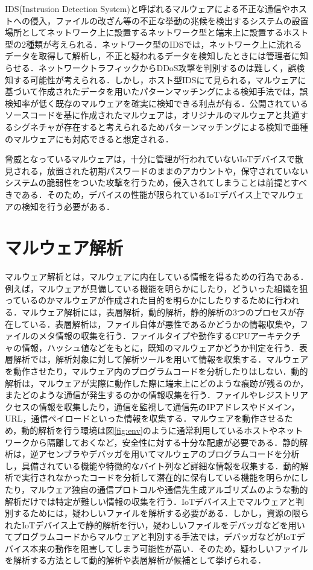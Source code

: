 IDS(Instrusion Detection System)と呼ばれるマルウェアによる不正な通信やホストへの侵入，ファイルの改ざん等の不正な挙動の兆候を検出するシステムの設置場所としてネットワーク上に設置するネットワーク型と端末上に設置するホスト型の2種類が考えられる．ネットワーク型のIDSでは，ネットワーク上に流れるデータを取得して解析し，不正と疑われるデータを検知したときには管理者に知らせる．ネットワークトラフィックからDDoS攻撃を判別するのは難しく，誤検知する可能性が考えられる．しかし，ホスト型IDSにて見られる，マルウェアに基づいて作成されたデータを用いたパターンマッチングによる検知手法では，誤検知率が低く既存のマルウェアを確実に検知できる利点が有る．公開されているソースコードを基に作成されたマルウェアは，オリジナルのマルウェアと共通するシグネチャが存在すると考えられるためパターンマッチングによる検知で亜種のマルウェアにも対応できると想定される．\par
脅威となっているマルウェアは，十分に管理が行われていないIoTデバイスで散見される，放置された初期パスワードのままのアカウントや，保守されていないシステムの脆弱性をついた攻撃を行うため，侵入されてしまうことは前提とすべきである．そのため，デバイスの性能が限られているIoTデバイス上でマルウェアの検知を行う必要がある．
\section{マルウェア解析}
マルウェア解析とは，マルウェアに内在している情報を得るための行為である．例えば，マルウェアが具備している機能を明らかにしたり，どういった組織を狙っているのかマルウェアが作成された目的を明らかにしたりするために行われる\cite{実践}．マルウェア解析には，表層解析，動的解析，静的解析の3つのプロセスが存在している．表層解析は，ファイル自体が悪性であるかどうかの情報収集や，ファイルのメタ情報の収集を行う．ファイルタイプや動作するCPUアーキテクチャの情報，ハッシュ値などをもとに，既知のマルウェアかどうか判定を行う．表層解析では，解析対象に対して解析ツールを用いて情報を収集する．マルウェアを動作させたり，マルウェア内のプログラムコードを分析したりはしない．動的解析は，マルウェアが実際に動作した際に端末上にどのような痕跡が残るのか，またどのような通信が発生するのかの情報収集を行う．ファイルやレジストリアクセスの情報を収集したり，通信を監視して通信先のIPアドレスやドメイン，URL，通信ペイロードといった情報を収集する．マルウェアを動作させるため，動的解析を行う環境は図\ref{fig:env}のように通常利用しているホストやネットワークから隔離しておくなど，安全性に対する十分な配慮が必要である．静的解析は，逆アセンブラやデバッガを用いてマルウェアのプログラムコードを分析し，具備されている機能や特徴的なバイト列など詳細な情報を収集する．動的解析で実行されなかったコードを分析して潜在的に保有している機能を明らかにしたり，マルウェア独自の通信プロトコルや通信先生成アルゴリズムのような動的解析だけでは特定が難しい情報の収集を行う．IoTデバイス上でマルウェアと判別するためには，疑わしいファイルを解析する必要がある．しかし，資源の限られたIoTデバイス上で静的解析を行い，疑わしいファイルをデバッガなどを用いてプログラムコードからマルウェアと判別する手法では，デバッガなどがIoTデバイス本来の動作を阻害してしまう可能性が高い．そのため，疑わしいファイルを解析する方法として動的解析や表層解析が候補として挙げられる．

